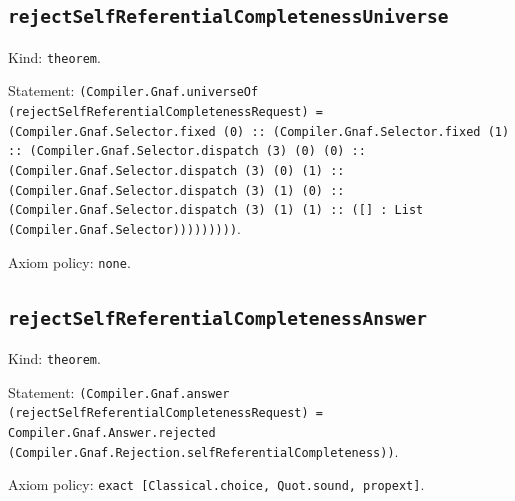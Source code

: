 \documentclass[11pt]{article}
\begin{document}
\subsection*{\texttt{rejectSelfReferentialCompletenessUniverse}}
\noindent Kind: \texttt{theorem}.\par
\noindent Statement: \texttt{(Compiler.Gnaf.universeOf (rejectSelfReferentialCompletenessRequest) = (Compiler.Gnaf.Selector.fixed (0) :: (Compiler.Gnaf.Selector.fixed (1) :: (Compiler.Gnaf.Selector.dispatch (3) (0) (0) :: (Compiler.Gnaf.Selector.dispatch (3) (0) (1) :: (Compiler.Gnaf.Selector.dispatch (3) (1) (0) :: (Compiler.Gnaf.Selector.dispatch (3) (1) (1) :: ([] : List (Compiler.Gnaf.Selector)))))))))}.\par
\noindent Axiom policy: \texttt{none}.\par
\subsection*{\texttt{rejectSelfReferentialCompletenessAnswer}}
\noindent Kind: \texttt{theorem}.\par
\noindent Statement: \texttt{(Compiler.Gnaf.answer (rejectSelfReferentialCompletenessRequest) = Compiler.Gnaf.Answer.rejected (Compiler.Gnaf.Rejection.selfReferentialCompleteness))}.\par
\noindent Axiom policy: \texttt{exact [Classical.choice, Quot.sound, propext]}.\par
\end{document}
